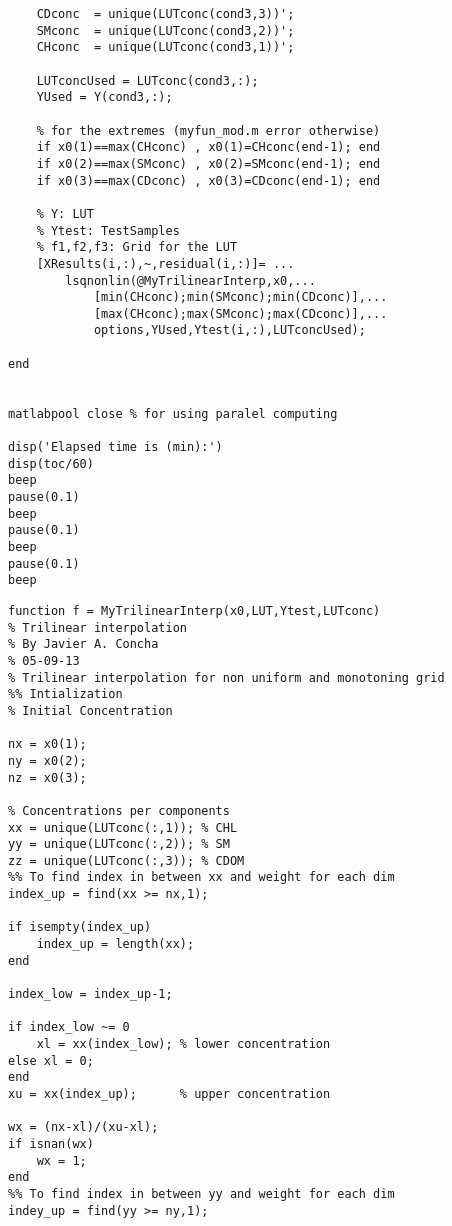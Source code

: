 \begin{appendices}
\begin{lstlisting}
    CDconc  = unique(LUTconc(cond3,3))';
    SMconc  = unique(LUTconc(cond3,2))';
    CHconc  = unique(LUTconc(cond3,1))';
    
    LUTconcUsed = LUTconc(cond3,:);
    YUsed = Y(cond3,:);
    
    % for the extremes (myfun_mod.m error otherwise)
    if x0(1)==max(CHconc) , x0(1)=CHconc(end-1); end
    if x0(2)==max(SMconc) , x0(2)=SMconc(end-1); end
    if x0(3)==max(CDconc) , x0(3)=CDconc(end-1); end
    
    % Y: LUT
    % Ytest: TestSamples
    % f1,f2,f3: Grid for the LUT
    [XResults(i,:),~,residual(i,:)]= ...
        lsqnonlin(@MyTrilinearInterp,x0,...
            [min(CHconc);min(SMconc);min(CDconc)],...
            [max(CHconc);max(SMconc);max(CDconc)],...
            options,YUsed,Ytest(i,:),LUTconcUsed);
    
end


matlabpool close % for using paralel computing

disp('Elapsed time is (min):')
disp(toc/60)
beep
pause(0.1)
beep
pause(0.1)
beep
pause(0.1)
beep
\end{lstlisting}




\singlespacing
{}
\renewcommand{\lstlistingname}{Code}
\begin{lstlisting}
function f = MyTrilinearInterp(x0,LUT,Ytest,LUTconc)
% Trilinear interpolation
% By Javier A. Concha
% 05-09-13
% Trilinear interpolation for non uniform and monotoning grid
%% Intialization
% Initial Concentration

nx = x0(1); 
ny = x0(2);
nz = x0(3);

% Concentrations per components
xx = unique(LUTconc(:,1)); % CHL
yy = unique(LUTconc(:,2)); % SM
zz = unique(LUTconc(:,3)); % CDOM
%% To find index in between xx and weight for each dim
index_up = find(xx >= nx,1);

if isempty(index_up)
    index_up = length(xx);
end

index_low = index_up-1;

if index_low ~= 0
    xl = xx(index_low); % lower concentration
else xl = 0;
end
xu = xx(index_up);      % upper concentration

wx = (nx-xl)/(xu-xl);
if isnan(wx)
    wx = 1;
end
%% To find index in between yy and weight for each dim
indey_up = find(yy >= ny,1);


\end{lstlisting}
\end{appendices}
